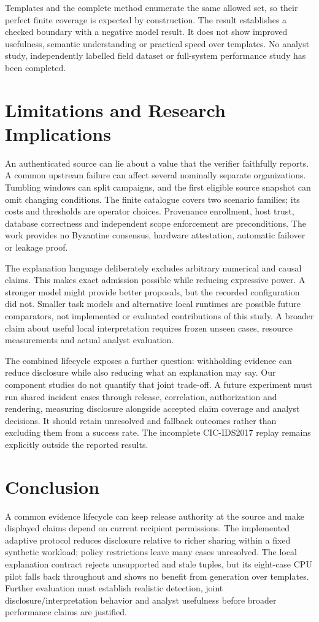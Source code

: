 \documentclass[conference,letterpaper]{IEEEtran}
\begin{document}
Templates and the complete method enumerate the same allowed set, so their perfect finite coverage is expected by construction. The result establishes a checked boundary with a negative model result. It does not show improved usefulness, semantic understanding or practical speed over templates. No analyst study, independently labelled field dataset or full-system performance study has been completed.





\section{Limitations and Research Implications}
An authenticated source can lie about a value that the verifier faithfully reports. A common upstream failure can affect several nominally separate organizations. Tumbling windows can split campaigns, and the first eligible source snapshot can omit changing conditions. The finite catalogue covers two scenario families; its costs and thresholds are operator choices. Provenance enrollment, host trust, database correctness and independent scope enforcement are preconditions. The work provides no Byzantine consensus, hardware attestation, automatic failover or leakage proof.

The explanation language deliberately excludes arbitrary numerical and causal claims. This makes exact admission possible while reducing expressive power. A stronger model might provide better proposals, but the recorded configuration did not. Smaller task models and alternative local runtimes are possible future comparators, not implemented or evaluated contributions of this study. A broader claim about useful local interpretation requires frozen unseen cases, resource measurements and actual analyst evaluation.

The combined lifecycle exposes a further question: withholding evidence can reduce disclosure while also reducing what an explanation may say. Our component studies do not quantify that joint trade-off. A future experiment must run shared incident cases through release, correlation, authorization and rendering, measuring disclosure alongside accepted claim coverage and analyst decisions. It should retain unresolved and fallback outcomes rather than excluding them from a success rate. The incomplete CIC-IDS2017 replay remains explicitly outside the reported results.

\section{Conclusion}
A common evidence lifecycle can keep release authority at the source and make displayed claims depend on current recipient permissions. The implemented adaptive protocol reduces disclosure relative to richer sharing within a fixed synthetic workload; policy restrictions leave many cases unresolved. The local explanation contract rejects unsupported and stale tuples, but its eight-case CPU pilot falls back throughout and shows no benefit from generation over templates. Further evaluation must establish realistic detection, joint disclosure/interpretation behavior and analyst usefulness before broader performance claims are justified.
\end{document}
